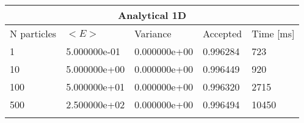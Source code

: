 \begin{tabular}{|l|l|l|l|l|}
\hline 
\multicolumn{5}{|c|}{Analytical 1D}\\ 
\hline 
N particles & $<E>$ & Variance & Accepted & Time [ms]\\ 
 \hline 
1 & 5.000000e-01 & 0.000000e+00 & 0.996284 & 723 \\ \hline 
10 & 5.000000e+00 & 0.000000e+00 & 0.996449 & 920 \\ \hline 
100 & 5.000000e+01 & 0.000000e+00 & 0.996320 & 2715 \\ \hline 
500 & 2.500000e+02 & 0.000000e+00 & 0.996494 & 10450 \\ \hline 
\label{i:a1} 
\end{tabular}